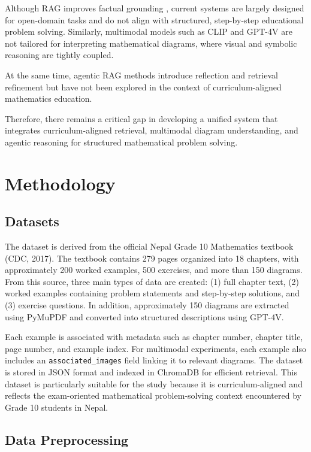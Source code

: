 \documentclass[11pt]{article}
\begin{document}
Although RAG improves factual grounding \cite{lewis2020retrieval}, current systems are largely designed for open-domain tasks and do not align with structured, step-by-step educational problem solving. Similarly, multimodal models such as CLIP \cite{radford2021learning} and GPT-4V \cite{openai2023gpt4} are not tailored for interpreting mathematical diagrams, where visual and symbolic reasoning are tightly coupled.

At the same time, agentic RAG methods \cite{asai2023self, yan2024corrective} introduce reflection and retrieval refinement but have not been explored in the context of curriculum-aligned mathematics education. 

Therefore, there remains a critical gap in developing a unified system that integrates curriculum-aligned retrieval, multimodal diagram understanding, and agentic reasoning for structured mathematical problem solving.

\section{Methodology}

\subsection{Datasets}

The dataset is derived from the official Nepal Grade 10 Mathematics textbook (CDC, 2017). The textbook contains 279 pages organized into 18 chapters, with approximately 200 worked examples, 500 exercises, and more than 150 diagrams. From this source, three main types of data are created: (1) full chapter text, (2) worked examples containing problem statements and step-by-step solutions, and (3) exercise questions. In addition, approximately 150 diagrams are extracted using PyMuPDF and converted into structured descriptions using GPT-4V.

Each example is associated with metadata such as chapter number, chapter title, page number, and example index. For multimodal experiments, each example also includes an \texttt{associated\_images} field linking it to relevant diagrams. The dataset is stored in JSON format and indexed in ChromaDB for efficient retrieval. This dataset is particularly suitable for the study because it is curriculum-aligned and reflects the exam-oriented mathematical problem-solving context encountered by Grade 10 students in Nepal.

\subsection{Data Preprocessing}
\end{document}
